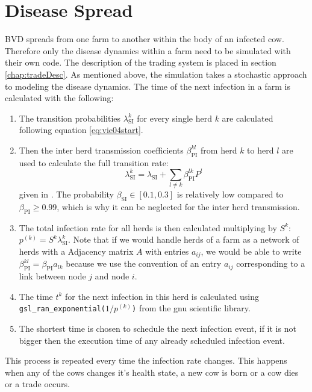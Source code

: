 \section{Disease Spread}
BVD spreads from one farm to another within the body of an infected cow. Therefore only the disease dynamics within a farm need to be simulated with their own code. The description of the trading system is placed in section \ref{chap:tradeDesc}. As mentioned above, the simulation takes a stochastic approach to modeling the disease dynamics. The time of the next infection in a farm is calculated with the following: \\
\begin{enumerate}
\item The transition probabilities $\lambda_\text{SI}^k$ for every single herd $k$ are calculated following equation \ref{eq:vie04start}.
\item Then the inter herd transmission coefficients $\beta^{kl}_\text{PI}$ from herd $k$ to herd $l$ are used to calculate the full transition rate:
\begin{equation}
\lambda_\text{SI}^k = \lambda_\text{SI} + \sum_{l \neq k} \beta^{lk}_\text{PI} P^l
\end{equation}
given in \citep{VIE04}. The probability $\beta_\text{SI} \in [0.1,0.3] $ is relatively low compared to $\beta_\text{PI} \geq 0.99$, which is why it can be neglected for the inter herd transmission.
\item The total infection rate for all herds is then calculated multiplying by $S^k$: $p^{(k)} = S^k \lambda_\text{SI}^k $. Note that if we would handle herds of a farm as a network of herds with a Adjacency matrix $A$ with entries $a_{ij}$, we would be able to write $\beta_\text{PI}^{kl}= \beta_\text{PI} a_{lk}$ because we use the convention of an entry $a_{ij}$ corresponding to a link between node $j$ and node $i$.
\item The time $t^k$ for the next infection in this herd is calculated using\\ {\tt gsl\_ran\_exponential($1/p^{(k)}$)} from the gnu scientific library.
\item The shortest time is chosen to schedule the next infection event, if it is not bigger then the execution time of any already scheduled infection event.
\end{enumerate}
This process is repeated every time the infection rate changes. This happens when any of the cows changes it's health state, a new cow is born or a cow dies or a trade occurs. 
